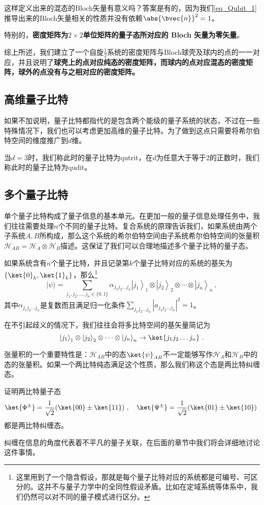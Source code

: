 这样定义出来的混态的Bloch矢量有意义吗？答案是有的，因为我们\autoref{eq_Qubit_1} 推导出来的Bloch矢量相关的性质并没有依赖$\abs{\bvec{n}}^2 = 1$。

特别的，\textbf{密度矩阵为$2\times 2$单位矩阵的量子态所对应的 Bloch 矢量为零矢量}。

综上所述，我们建立了一个自旋$\frac{1}{2}$系统的密度矩阵与Bloch球壳及球内的点的一一对应，并且说明了\textbf{球壳上的点对应纯态的密度矩阵，而球内的点对应混态的密度矩阵，球外的点没有与之相对应的密度矩阵。}



\subsection{高维量子比特}

如果不加说明，量子比特都指代的是包含两个能级的量子系统的状态，不过在一些特殊情况下，我们也可以考虑更加高维的量子比特。为了做到这点只需要将希尔伯特空间的维度推广到$d$维。

当$d=3$时，我们称此时的量子比特为qutrit，在$d$为任意大于等于2的正数时，我们称此时的量子比特为qudit。

\subsection{多个量子比特}


单个量子比特构成了量子信息的基本单元。在更加一般的量子信息处理任务中，我们往往需要处理$n$个不同的量子比特。复合系统的原理告诉我们，如果系统由两个子系统$A,B$所构成，那么这个系统的希尔伯特空间由子系统希尔伯特空间的张量积$\mathcal{H}_{AB}=\mathcal{H}_A\otimes\mathcal{H}_B$描述。这保证了我们可以合理地描述多个量子比特的量子态。

如果系统含有$n$个量子比特，并且记录第$k$个量子比特对应的系统的基矢为$\{\ket{0}_k,\ket{1}_k\}$，那么\footnote{这里用到了一个隐含假设，那就是每个量子比特对应的系统都是可编号、可区分的。这并不与量子力学中的全同性假设矛盾。比如在定域系统等体系中，我们仍然可以对不同的量子模式进行区分。}$$
|\psi\rangle=\sum_{j_1, j_2, \ldots, j_n \in\{0,1\}} \alpha_{j_1 j_2 \ldots j_n}\left|j_1\right\rangle_1 \otimes\left|j_2\right\rangle_2 \otimes \cdots \otimes\left|j_n\right\rangle_n~,
$$其中$\alpha_{j_1j_2\ldots j_n}$是复数而且满足归一化条件$\sum_{j_1j_2\ldots j_n}|a_{j_1j_2\ldots j_n}|^2=1$。

在不引起歧义的情况下，我们往往会将多比特空间的基矢量简记为$$\left|j_1\right\rangle_1 \otimes\left|j_2\right\rangle_2 \otimes \cdots \otimes\left|j_n\right\rangle_n\to \ket{j_1j_2\ldots j_n}~. $$

张量积的一个重要特性是：$\mathcal{H}_{AB}$中的态$\ket{\psi}_{AB}$不一定能够写作$\mathcal{H}_A$和$\mathcal{H}_B$中的态的张量积。如果一个两比特纯态满足这个性质，那么我们称这个态是两比特纠缠态。
\begin{exercise}{}
证明两比特量子态$$\ket{\Phi^{\pm}}=\frac{1}{\sqrt{2}}(\ket{00}\pm\ket{11})~,\quad \ket{\Psi^{\pm}}=\frac{1}{\sqrt{2}}(\ket{01}\pm\ket{10})~$$
都是两比特纠缠态。
\end{exercise}

纠缠在信息的角度代表着不平凡的量子关联，在后面的章节中我们将会详细地讨论这件事情。
